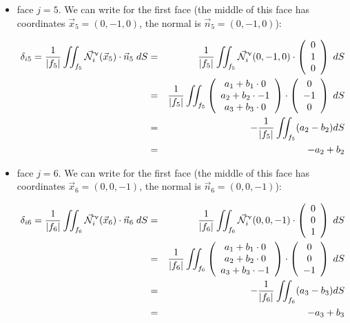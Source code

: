 \begin{itemize}
\item face $j=5$. We can write for the first face (the middle of this face has coordinates 
$\vec{x}_5=(0,-1,0)$, the normal is $\vec{n}_5=(0,-1,0)$):

\begin{eqnarray}
\delta_{i5}=
\frac{1}{|f_5|} \iint_{f_5}
\vec{{\mathcal{N}}}^\upnu_i( \vec{x}_5) \cdot \vec{n}_5 \; dS
&=&\frac{1}{|f_5|} \iint_{f_5} \vec{{\mathcal{N}}}^\upnu_i( 0,-1,0) \cdot 
\left(\begin{array}{c} 0 \\ 1  \\ 0\end{array}\right) \; dS \nonumber\\
&=& \frac{1}{|f_5|} \iint_{f_5} 
\left(\begin{array}{c} a_1+b_1\cdot 0 \\ a_2 + b_2 \cdot -1 \\ a_3 + b_3\cdot 0 \end{array}\right)
\cdot \left(\begin{array}{c} 0 \\ -1 \\ 0 \end{array}\right) \; dS \nonumber\\
&=& -\frac{1}{|f_5|} \iint_{f_5} (a_2-b_2) dS \nonumber\\
&=& -a_2+b_2
\end{eqnarray}


\item face $j=6$. We can write for the first face (the middle of this face has coordinates 
$\vec{x}_6=(0,0,-1)$, the normal is $\vec{n}_6=(0,0,-1)$):


\begin{eqnarray}
\delta_{i6}=
\frac{1}{|f_6|} \iint_{f_6}
\vec{{\mathcal{N}}}^\upnu_i( \vec{x}_6) \cdot \vec{n}_6 \; dS
&=&\frac{1}{|f_6|} \iint_{f_6} \vec{{\mathcal{N}}}^\upnu_i( 0,0,-1) \cdot 
\left(\begin{array}{c} 0 \\ 0  \\ 1\end{array}\right) \; dS \nonumber\\
&=& \frac{1}{|f_6|} \iint_{f_6} 
\left(\begin{array}{c} a_1+b_1\cdot 0 \\ a_2 + b_2 \cdot 0 \\ a_3 + b_3\cdot -1 \end{array}\right)
\cdot \left(\begin{array}{c} 0 \\ 0 \\ -1 \end{array}\right) \; dS \nonumber\\
&=& -\frac{1}{|f_6|} \iint_{f_6} (a_3-b_3) dS \nonumber\\
&=& -a_3+b_3
\end{eqnarray}

\end{itemize}

